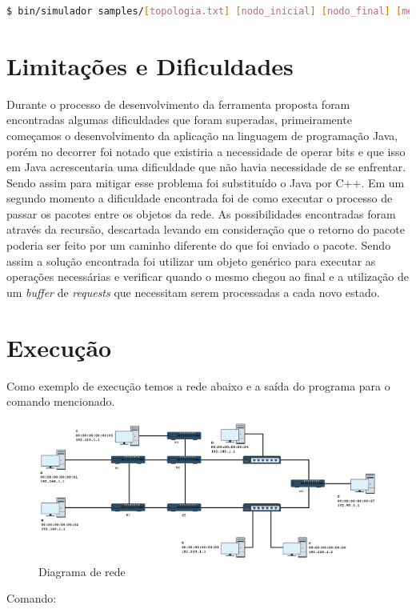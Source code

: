 \documentclass[12pt]{article}
\begin{document}
\begin{lstlisting}[breaklines=true,language=sh]
$ bin/simulador samples/[topologia.txt] [nodo_inicial] [nodo_final] [menssagem]
\end{lstlisting}


\section{Limitações e Dificuldades}
Durante o processo de desenvolvimento da ferramenta proposta foram encontradas algumas dificuldades que foram superadas, primeiramente começamos o desenvolvimento da aplicação na linguagem de programação Java, porém no decorrer foi notado que existiria a necessidade de operar bits e que isso em Java acrescentaria uma dificuldade que não havia necessidade de se enfrentar. Sendo assim para mitigar esse problema foi substituído o Java por C++. Em um segundo momento a dificuldade encontrada foi de como executar o processo de passar os pacotes entre os objetos da rede. As possibilidades encontradas foram através da recursão, descartada levando em consideração que o retorno do pacote poderia ser feito por um caminho diferente do que foi enviado o pacote. Sendo assim a solução encontrada foi utilizar um objeto genérico para executar as operações necessárias e verificar quando o mesmo chegou ao final e a utilização de um \emph{buffer} de \emph{requests} que necessitam serem processadas a cada novo estado.

\section{Execução}
Como exemplo de execução temos a rede abaixo e a saída do programa para o comando mencionado.

\begin{figure}[ht]
\centering
\includegraphics[width=1\textwidth]{NetworkDiagram_01.png}
\caption{Diagrama de rede}
\label{fig:NetworkDiagram_01}
\end{figure}
Comando:
\end{document}
